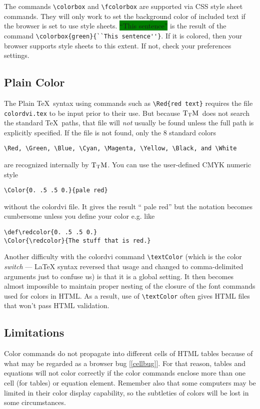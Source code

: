 \documentclass[12pt]{article}
\newif\ifttm
\def\TtM{$\rm{}T_TH$}
\def\TtM{$\rm{}T_TM$}%
\begin{document}
The commands \verb!\colorbox! and \verb!\fcolorbox! are supported via
CSS style sheet commands. They will only work to set the background
color of included text if the browser is set to use style sheets. 
\colorbox{green}{``This sentence''} is the result of the command
\verb!\colorbox{green}{``This sentence''}!. If it is colored, then
your browser supports style sheets to this extent. If not, check your
preferences settings.

\subsection{Plain Color}

The Plain \TeX\ syntax using commands such as \verb!\Red{red text}! requires
the file \verb!colordvi.tex! to be input prior to their use. But
because \TtM\ does not search the standard \TeX\ paths, that file will
\emph{not} usually be found unless the full path is explicitly
specified. If the file is not found, only the 8 standard colors
\begin{verbatim}
\Red, \Green, \Blue, \Cyan, \Magenta, \Yellow, \Black, and \White
\end{verbatim}
 are
recognized internally by \TtM. You can use the user-defined CMYK numeric
style 
\begin{verbatim}
\Color{0. .5 .5 0.}{pale red}
\end{verbatim}
without the colordvi
file. It gives the result ``\ifttm\Color{0. .5 .5 0.}{pale red}\else
\textcolor[cmyk]{0.,.5,.5,0.}{pale red}\fi'' but the
notation becomes cumbersome unless you define your color
e.g. like
\begin{verbatim}
\def\redcolor{0. .5 .5 0.}
\Color{\redcolor}{The stuff that is red.}
\end{verbatim}

Another difficulty with the colordvi
command \verb!\textColor! (which is the color \emph{switch} --- \LaTeX
syntax reversed that usage and changed to comma-delimited arguments
just to confuse us) is that it is a global setting. It then
becomes almost impossible to maintain proper nesting of the closure of
the font commands used for colors in HTML. As a result, use of
\verb!\textColor! often gives HTML files that won't pass HTML validation.

\subsection{Limitations}
Color commands do not propagate into different cells of HTML tables
because of what may be regarded as a browser bug
[\ref{cellbug}]. For that reason, tables and equations will not color
correctly if the color commands enclose more than one cell (for
tables) or equation element. Remember also that some computers may be
limited in their color display capability, so the subtleties of colors
will be lost in some circumstances. 
\end{document}
